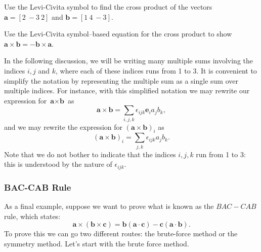 \begin{exercise}
Use the Levi-Civita symbol to find the cross product of the vectors $\textbf{a}=[2~-3~2]$ and $\textbf{b}=[1~4~-3]$.
\end{exercise}

\begin{exercise}
Use the Levi-Civita symbol--based equation for the cross product to show $\textbf{a} \times \textbf{b} = -\textbf{b} \times \textbf{a}$.
\end{exercise}   

In the following discussion, we will be writing many multiple sums involving the indices $i,j$ and $k$, where each of these indices runs from 1 to 3. It is convenient to simplify the notation by representing the multiple sum as a single sum over multiple indices. For instance, with this simplified notation we may rewrite our expression for 
$\textbf{a} \times \textbf{b}$ as
\[\textbf{a} \times \textbf{b} =  \sum_{i,j,k} \epsilon_{ijk} \textbf{e}_i  a_j b_k, \]
and we may rewrite the expression for 
$(\textbf{a} \times \textbf{b})_i$ as
\[ (\textbf{a} \times \textbf{b})_i = \sum_{j,k} \epsilon_{ijk} a_j b_k. \]
Note that we do not bother to indicate that the indices $i,j,k$ run from 1 to 3: this is understood by the nature of $\epsilon_{ijk}$.

\subsubsection*{BAC-CAB Rule}
As a final example, suppose we want to prove what is known as the $BAC-CAB$ rule, which states:
\[ \textbf{a} \times \left( \textbf{b} \times \textbf{c} \right) = \textbf{b} \left( \textbf{a} \cdot \textbf{c} \right) - \textbf{c} \left( \textbf{a} \cdot \textbf{b} \right). \]
To prove this we can go two different routes: the brute-force method or the symmetry method.  Let's start with the brute force method.

